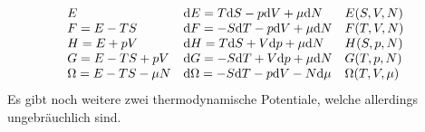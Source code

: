 \begin{equation}
    \begin{array}{lll}
        E & \mathrm{d} E = T \mathrm{d} S - p \mathrm{d} V + \mu \mathrm{d} N & E(S, V, N) \\
        F = E - TS & \mathrm{d} F = - S \mathrm{d} T - p \mathrm{d} V + \mu \mathrm{d} N & F(T, V, N) \\
        H = E + pV & \mathrm{d} H = T \mathrm{d} S + V \mathrm{d} p + \mu \mathrm{d} N & H(S, p, N) \\
        G = E - TS + pV & \mathrm{d} G = - S \mathrm{d} T + V \mathrm{d} p + \mu \mathrm{d} N & G(T, p, N) \\
        \Omega = E - TS - \mu N & \mathrm{d} \Omega = - S \mathrm{d} T - p \mathrm{d} V - N \mathrm{d} \mu & \Omega(T, V, \mu)
    \end{array}
\end{equation}
Es gibt noch weitere zwei thermodynamische Potentiale, welche allerdings ungebräuchlich sind.